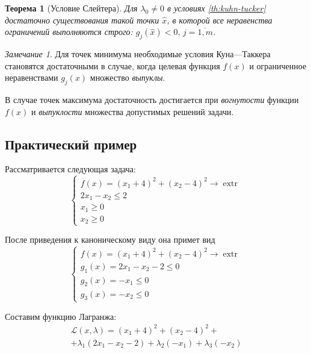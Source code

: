 \documentclass{article}
\renewcommand{\leq}{\leqslant}
\renewcommand{\geq}{\geqslant}
\providecommand{\La}{\mathcal{L}}
\DeclareMathOperator{\extr}{extr}
\newtheorem{thm}{Теорема}[section]
\theoremstyle{remark}
\newtheorem{rem}{Замечание}[section]
\theoremstyle{definition}
\numberwithin{equation}{section}
\begin{document}
\begin{thm}[Условие Слейтера]
  Для $\lambda_0 \neq 0$ в условиях \ref{th:kuhn-tucker} достаточно
  существования такой точки $\hat{x}$, в которой все неравенства
  ограничений выполняются строго: $g_j(\hat{x})<0,\,
  j=\overline{1,m}$.
\end{thm}

\begin{rem}
  Для точек минимума необходимые условия Куна—Таккера становятся
  достаточными в случае, когда целевая функция $f(x)$ и ограниченное
  неравенствами $g_j(x)$ множество \emph{выпуклы}.

  В случае точек максимума достаточность достигается при
  \emph{вогнутости} функции $f(x)$ и \emph{выпуклости} множества
  допустимых решений задачи.
\end{rem}

\subsection{Практический пример}

Рассматривается следующая задача:
\begin{equation*}
  \begin{cases}
    f(x) = (x_1+4)^2 + (x_2-4)^2 \to \extr \\
    2x_1 - x_2 \leq 2 \\
    x_1 \geq 0 \\
    x_2 \geq 0
  \end{cases}
\end{equation*}

После приведения к каноническому виду она примет вид
\begin{equation}
  \label{eq:cond-optim-problem}
  \begin{cases}
    f(x) = (x_1+4)^2 + (x_2-4)^2 \to \extr \\
    g_1(x) = 2x_1 - x_2 - 2 \leq 0 \\
    g_2(x) = -x_1 \leq 0 \\
    g_3(x) = -x_2 \leq 0
  \end{cases}
\end{equation}

Составим функцию Лагранжа:
\begin{multline}
  \label{eq:lagrange}
  \La(x, \lambda) = (x_1+4)^2 + (x_2-4)^2 +\\
  + \lambda_1(2x_1-x_2-2)+\lambda_2(-x_1)+\lambda_3(-x_2)
\end{multline}
\end{document}
